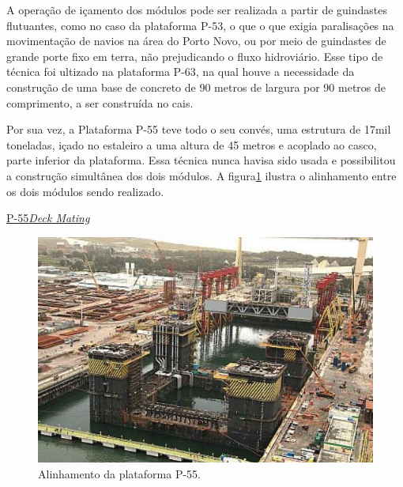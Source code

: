 A operação de içamento dos módulos pode ser realizada a partir de guindastes
flutuantes, como no caso da plataforma P-53, o que o que exigia paralisações 
na movimentação de navios na área do Porto Novo, ou por meio de guindastes de grande porte 
fixo em terra, não prejudicando o fluxo hidroviário. Esse tipo de técnica foi
ultizado na plataforma P-63, na qual houve a necessidade da
construção de uma base de concreto de 90 metros de largura por 90 metros de
comprimento, a ser construída no cais.

Por sua vez, a Plataforma P-55 teve todo o seu convés, uma estrutura de 17mil
toneladas, içado no estaleiro a uma altura de 45 metros e acoplado ao casco,
parte inferior da plataforma. Essa técnica nunca havisa sido usada e
possibilitou a construção simultânea dos dois módulos. A figura\ref{P55} ilustra
o alinhamento entre os dois módulos sendo realizado.

\href{http://www.offshoreenergytoday.com/brazils-petrobras-completes-deck-mating-on-p-55-platform/}{P-55\textit{Deck
Mating}}

\begin{figure}[h!]
    \centering
    \includegraphics[width=0.9\columnwidth]{figs/mating/P55}
    \caption{Alinhamento da plataforma P-55.}
    \label{P55}
\end{figure} 


